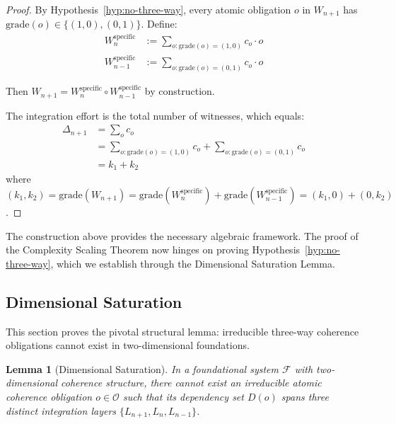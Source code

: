 \documentclass[11pt]{article}
\newtheorem{lemma}[theorem]{Lemma}
\theoremstyle{definition}
\theoremstyle{remark}
\begin{document}
\begin{proof}
By Hypothesis~\ref{hyp:no-three-way}, every atomic obligation $o$ in $W_{n+1}$ has $\text{grade}(o) \in \{(1,0), (0,1)\}$.
Define:
\begin{align*}
W_n^{\text{specific}} &:= \sum_{o : \text{grade}(o) = (1,0)} c_o \cdot o \\
W_{n-1}^{\text{specific}} &:= \sum_{o : \text{grade}(o) = (0,1)} c_o \cdot o
\end{align*}

Then $W_{n+1} = W_n^{\text{specific}} \circ W_{n-1}^{\text{specific}}$ by construction.

The integration effort is the total number of witnesses, which equals:
\begin{align*}
\Delta_{n+1} &= \sum_o c_o \\
&= \sum_{o : \text{grade}(o) = (1,0)} c_o + \sum_{o : \text{grade}(o) = (0,1)} c_o \\
&= k_1 + k_2
\end{align*}
where $(k_1, k_2) = \text{grade}(W_{n+1}) = \text{grade}(W_n^{\text{specific}}) + \text{grade}(W_{n-1}^{\text{specific}}) = (k_1, 0) + (0, k_2)$.
\end{proof}

The construction above provides the necessary algebraic framework. The proof of the Complexity
Scaling Theorem now hinges on proving Hypothesis~\ref{hyp:no-three-way}, which we establish
through the Dimensional Saturation Lemma.

\subsection{Dimensional Saturation}
\label{app:dimensional-saturation}

This section proves the pivotal structural lemma: irreducible three-way coherence obligations
cannot exist in two-dimensional foundations.

\begin{lemma}[Dimensional Saturation]
\label{lem:dimensional-saturation-full}
In a foundational system $\mathcal{F}$ with two-dimensional coherence structure, there cannot exist an
\emph{irreducible} atomic coherence obligation $o \in \mathcal{O}$ such that its dependency set $D(o)$ spans
three distinct integration layers $\{L_{n+1}, L_n, L_{n-1}\}$.
\end{lemma}
\end{document}
